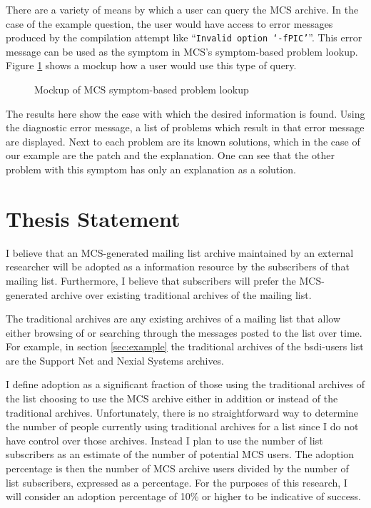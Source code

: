 There are a variety of means by which a user can query the MCS archive. In the
case of the example question, the user would have access to error messages
produced by the compilation attempt like ``{\tt Invalid option `-fPIC'}''. This 
error message can be used as the symptom in MCS's symptom-based problem
lookup. Figure \ref{fig:mcs-symptomlookup} shows a mockup how a user would use
this type of query.

\begin{figure}[htbp]
  {\centerline {}}
  \caption{Mockup of MCS symptom-based problem lookup}
  \label{fig:mcs-symptomlookup}
\end{figure}

The results here show the ease with which the desired information is found.
Using the diagnostic error message, a list of problems which result in that
error message are displayed. Next to each problem are its known solutions,
which in the case of our example are the patch and the explanation. One can see
that the other problem with this symptom has only an explanation as a solution.

\section{Thesis Statement}
\label{sec:thesis-statement}
I believe that an MCS-generated mailing list archive maintained by an external
researcher will be adopted as a information resource by the subscribers of that
mailing list.  Furthermore, I believe that subscribers will prefer the
MCS-generated archive over existing traditional archives of the mailing list.

The traditional archives are any existing archives of a mailing list that allow 
either browsing of or searching through the messages posted to the list over
time. For example, in section \ref{sec:example} the traditional archives of the 
bsdi-users list are the Support Net and Nexial Systems archives.

I define adoption as a significant fraction of those using the traditional
archives of the list choosing to use the MCS archive either in addition or
instead of the traditional archives. Unfortunately, there is no straightforward
way to determine the number of people currently using traditional archives for
a list since I do not have control over those archives. Instead I plan to use
the number of list subscribers as an estimate of the number of potential MCS
users. The adoption percentage is then the number of MCS archive users divided
by the number of list subscribers, expressed as a percentage. For the purposes
of this research, I will consider an adoption percentage of 10\% or higher to
be indicative of success.

